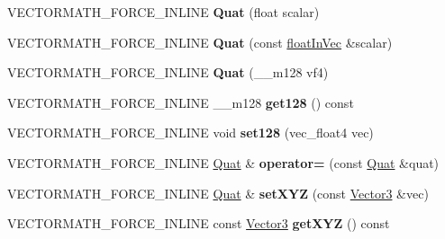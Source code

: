 \begin{DoxyCompactItemize}
V\+E\+C\+T\+O\+R\+M\+A\+T\+H\+\_\+\+F\+O\+R\+C\+E\+\_\+\+I\+N\+L\+I\+NE {\bfseries Quat} (float scalar)
\item 
\mbox{\label{classVectormath_1_1Aos_1_1Quat_a121d29b49a881a553de03b7df07e0c6f}} 
V\+E\+C\+T\+O\+R\+M\+A\+T\+H\+\_\+\+F\+O\+R\+C\+E\+\_\+\+I\+N\+L\+I\+NE {\bfseries Quat} (const \hyperlink{classVectormath_1_1floatInVec}{float\+In\+Vec} \&scalar)
\item 
\mbox{\label{classVectormath_1_1Aos_1_1Quat_af62400c0f8225b7d63abd214f63afb88}} 
V\+E\+C\+T\+O\+R\+M\+A\+T\+H\+\_\+\+F\+O\+R\+C\+E\+\_\+\+I\+N\+L\+I\+NE {\bfseries Quat} (\+\_\+\+\_\+m128 vf4)
\item 
\mbox{\label{classVectormath_1_1Aos_1_1Quat_ab463a6812298a674271ade56343660e6}} 
V\+E\+C\+T\+O\+R\+M\+A\+T\+H\+\_\+\+F\+O\+R\+C\+E\+\_\+\+I\+N\+L\+I\+NE \+\_\+\+\_\+m128 {\bfseries get128} () const
\item 
\mbox{\label{classVectormath_1_1Aos_1_1Quat_a40df4361da2c782091f24749349812f7}} 
V\+E\+C\+T\+O\+R\+M\+A\+T\+H\+\_\+\+F\+O\+R\+C\+E\+\_\+\+I\+N\+L\+I\+NE void {\bfseries set128} (vec\+\_\+float4 vec)
\item 
\mbox{\label{classVectormath_1_1Aos_1_1Quat_a60c4c39e0aab60957f341978df7ef64e}} 
V\+E\+C\+T\+O\+R\+M\+A\+T\+H\+\_\+\+F\+O\+R\+C\+E\+\_\+\+I\+N\+L\+I\+NE \hyperlink{classVectormath_1_1Aos_1_1Quat}{Quat} \& {\bfseries operator=} (const \hyperlink{classVectormath_1_1Aos_1_1Quat}{Quat} \&quat)
\item 
\mbox{\label{classVectormath_1_1Aos_1_1Quat_a9bc1efa2dcf5094f5e887d618c578340}} 
V\+E\+C\+T\+O\+R\+M\+A\+T\+H\+\_\+\+F\+O\+R\+C\+E\+\_\+\+I\+N\+L\+I\+NE \hyperlink{classVectormath_1_1Aos_1_1Quat}{Quat} \& {\bfseries set\+X\+YZ} (const \hyperlink{classVectormath_1_1Aos_1_1Vector3}{Vector3} \&vec)
\item 
\mbox{\label{classVectormath_1_1Aos_1_1Quat_a8e0a884121d4b8ad24f3a73b46917520}} 
V\+E\+C\+T\+O\+R\+M\+A\+T\+H\+\_\+\+F\+O\+R\+C\+E\+\_\+\+I\+N\+L\+I\+NE const \hyperlink{classVectormath_1_1Aos_1_1Vector3}{Vector3} {\bfseries get\+X\+YZ} () const

\end{DoxyCompactItemize}
